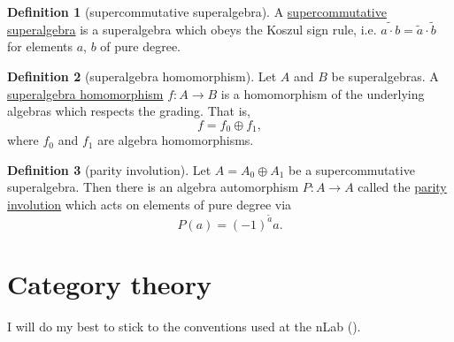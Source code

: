 \documentclass[a4paper,10pt]{scrreprt}
\newcommand{\defn}[1]{\ul{#1}}
\theoremstyle{definition}
\newtheorem{definition}{Definition}[section]
\theoremstyle{plain}
\theoremstyle{remark}
\begin{document}
\begin{definition}[supercommutative superalgebra]
  \label{def:supercommutativesuperalgebra}
  A \defn{supercommutative superalgebra} is a superalgebra which obeys the Koszul sign rule, i.e.  $\widetilde{a \cdot b} = \tilde{a} \cdot \tilde{b}$ for elements $a$, $b$ of pure degree.
\end{definition}

\begin{definition}[superalgebra homomorphism]
  \label{def:superalgebrahomomorphism}
  Let $A$ and $B$ be superalgebras. A \defn{superalgebra homomorphism} $f\colon A \to B$ is a homomorphism of the underlying algebras which respects the grading. That is, 
  \begin{equation*}
    f = f_{0} \oplus f_{1},
  \end{equation*}
  where $f_{0}$ and $f_{1}$ are algebra homomorphisms.
\end{definition}

\begin{definition}[parity involution]
  \label{def:parityinvolution}
  Let $A = A_{0} \oplus A_{1}$ be a supercommutative superalgebra. Then there is an algebra automorphism $P\colon A\to A$ called the \defn{parity involution} which acts on elements of pure degree via
  \begin{equation*}
    P(a) = (-1)^{\tilde{a}}a.
  \end{equation*}
\end{definition}

\chapter{Category theory} \label{ch:categories}
I will do my best to stick to the conventions used at the nLab (\cite{nlab}).
\end{document}

